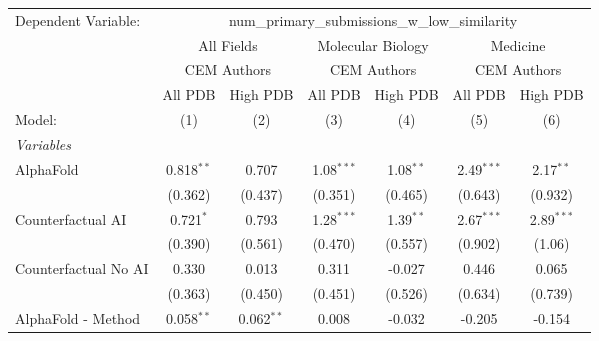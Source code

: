 \begingroup
\centering
\begin{tabular}{lcccccc}
   \tabularnewline \midrule \midrule
   Dependent Variable: & \multicolumn{6}{c}{num\_primary\_submissions\_w\_low\_similarity}\\
 & \multicolumn{2}{c}{All Fields} & \multicolumn{2}{c}{Molecular Biology} & \multicolumn{2}{c}{Medicine} \\
\cmidrule(lr){2-3} \cmidrule(lr){4-5} \cmidrule(lr){6-7}
 & \multicolumn{2}{c}{CEM Authors} & \multicolumn{2}{c}{CEM Authors} & \multicolumn{2}{c}{CEM Authors} \\
\cmidrule(lr){2-3} \cmidrule(lr){4-5} \cmidrule(lr){6-7}
 & \multicolumn{1}{c}{All PDB} & \multicolumn{1}{c}{High PDB} & \multicolumn{1}{c}{All PDB} & \multicolumn{1}{c}{High PDB} & \multicolumn{1}{c}{All PDB} & \multicolumn{1}{c}{High PDB} \\
\cmidrule(lr){2-2} \cmidrule(lr){3-3} \cmidrule(lr){4-4} \cmidrule(lr){5-5} \cmidrule(lr){6-6} \cmidrule(lr){7-7}
   Model:                                                     & (1)          & (2)           & (3)           & (4)           & (5)           & (6)\\  
   \midrule
   \emph{Variables}\\
   AlphaFold                                                  & 0.818$^{**}$ & 0.707         & 1.08$^{***}$  & 1.08$^{**}$   & 2.49$^{***}$  & 2.17$^{**}$\\   
                                                              & (0.362)      & (0.437)       & (0.351)       & (0.465)       & (0.643)       & (0.932)\\   
   Counterfactual AI                                          & 0.721$^{*}$  & 0.793         & 1.28$^{***}$  & 1.39$^{**}$   & 2.67$^{***}$  & 2.89$^{***}$\\   
                                                              & (0.390)      & (0.561)       & (0.470)       & (0.557)       & (0.902)       & (1.06)\\   
   Counterfactual No AI                                       & 0.330        & 0.013         & 0.311         & -0.027        & 0.446         & 0.065\\   
                                                              & (0.363)      & (0.450)       & (0.451)       & (0.526)       & (0.634)       & (0.739)\\   
   AlphaFold - Method                                         & 0.058$^{**}$ & 0.062$^{**}$  & 0.008         & -0.032        & -0.205        & -0.154\\   

\end{tabular}
